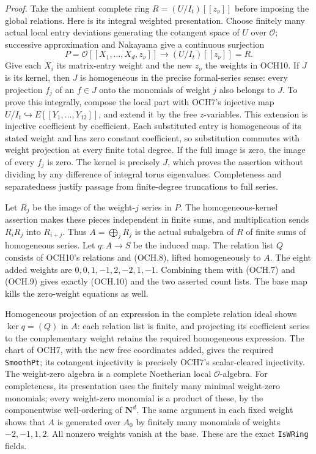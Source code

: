 \documentclass[11pt,a4paper]{article}
\numberwithin{equation}{section}
\theoremstyle{remark}\newtheorem{remark}[theorem]{Remark}
\begin{document}
\emph{Proof.}
Take the ambient complete ring
\(R=(U/I_t)[[z_\nu]]\) before imposing the global relations.
Here is its integral weighted presentation.  Choose finitely many
actual local entry deviations generating the cotangent space of
\(U\) over \(\mathcal O\); successive approximation and
Nakayama give a continuous surjection
\[
 P=\mathcal O[[X_1,\ldots,X_d,z_\nu]]
       \longrightarrow (U/I_t)[[z_\nu]]=R.
\]
Give each \(X_i\) its matrix-entry weight and the new
\(z_\nu\) the weights in OCH10.  If \(J\) is its kernel,
then \(J\) is homogeneous in the precise formal-series sense:
every projection \(f_j\) of an \(f\in J\) onto the
monomials of weight \(j\) also belongs to \(J\).
To prove this integrally, compose the local part with OCH7's
injective map \(U/I_t\hookrightarrow E[[Y_1,\ldots,Y_{12}]]\),
and extend it by the free \(z\)-variables.  This extension is
injective coefficient by coefficient.  Each substituted entry is
homogeneous of its stated weight and has zero constant coefficient,
so substitution commutes with weight projection at every finite
total degree.  If the full image is zero, the image of every
\(f_j\) is zero.  The kernel is precisely \(J\), which
proves the assertion without dividing by any difference of integral
torus eigenvalues.  Completeness and separatedness justify passage
from finite-degree truncations to full series.

Let \(R_j\) be the image of the weight-\(j\) series in
\(P\).  The homogeneous-kernel assertion makes these pieces
independent in finite sums, and multiplication sends
\(R_iR_j\) into \(R_{i+j}\).  Thus
\(A=\bigoplus_j R_j\) is the actual subalgebra of \(R\)
of finite sums of homogeneous series.  Let
\(q:A\to S\) be the induced map.  The relation list \(Q\)
consists of OCH10's relations and (OCH.8), lifted homogeneously to
\(A\).  The eight added weights are
\(0,0,1,-1,2,-2,1,-1\).  Combining them with (OCH.7) and
(OCH.9) gives exactly (OCH.10) and the two asserted count lists.
The base map kills the zero-weight equations as well.

Homogeneous projection of an expression in the complete relation
ideal shows
\(\ker q=(Q)\) in \(A\): each relation list is finite,
and projecting its coefficient series to the complementary weight
retains the required homogeneous expression.  The chart of OCH7,
with the new free coordinates added, gives the required
\texttt{Smooth\allowbreak Pt}; its cotangent injectivity is precisely OCH7's
scalar-cleared injectivity.  The weight-zero algebra is a complete
Noetherian local \(\mathcal O\)-algebra.  For completeness,
its presentation uses the finitely many minimal weight-zero
monomials; every weight-zero monomial is a product of these,
by the componentwise well-ordering of \(\mathbf N^d\).
The same argument in each fixed weight shows that \(A\) is
generated over \(A_0\) by finitely many monomials of weights
\(-2,-1,1,2\).  All nonzero weights vanish at the base.
These are the exact \texttt{Is\allowbreak WRing} fields.
\end{document}

